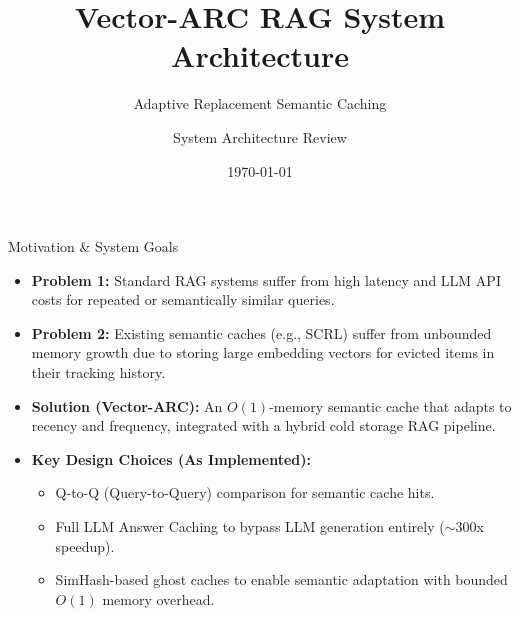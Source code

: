 \documentclass[aspectratio=169]{beamer}
\title{Vector-ARC RAG System Architecture}
\subtitle{Adaptive Replacement Semantic Caching}
\author{System Architecture Review}
\date{\today}
\begin{document}
\begin{frame}
    \titlepage
\end{frame}

\begin{frame}{Motivation \& System Goals}
    \begin{itemize}
        \item \textbf{Problem 1:} Standard RAG systems suffer from high latency and LLM API costs for repeated or semantically similar queries.
        \item \textbf{Problem 2:} Existing semantic caches (e.g., SCRL) suffer from unbounded memory growth due to storing large embedding vectors for evicted items in their tracking history.
        \item \textbf{Solution (Vector-ARC):} An $O(1)$-memory semantic cache that adapts to recency and frequency, integrated with a hybrid cold storage RAG pipeline.
        \item \textbf{Key Design Choices (As Implemented):}
        \begin{itemize}
            \item Q-to-Q (Query-to-Query) comparison for semantic cache hits.
            \item Full LLM Answer Caching to bypass LLM generation entirely ($\sim$300x speedup).
            \item SimHash-based ghost caches to enable semantic adaptation with bounded $O(1)$ memory overhead.
        \end{itemize}
    \end{itemize}
\end{frame}
\end{document}
